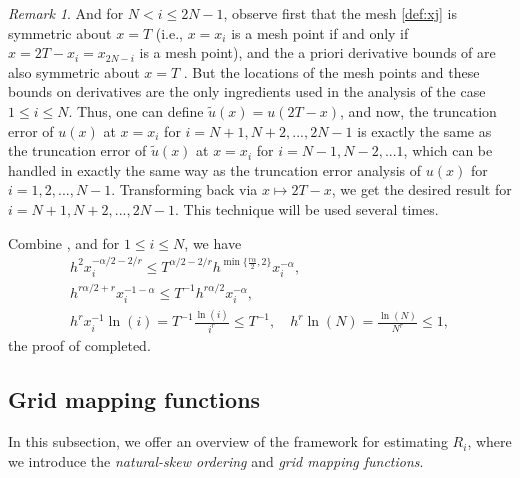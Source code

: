 \documentclass{amsart}
\theoremstyle{definition}
\theoremstyle{remark}
\newtheorem{remark}[theorem]{Remark}
\numberwithin{equation}{section}
\begin{document}
\begin{remark} \label{rmk:symm}
And for \(N<i\le 2N-1\), observe first that the mesh \eqref{def:xj} is symmetric about $x = T$ (i.e., $x = x_i$ is a mesh point if and only if $x = 2T - x_i = x_{2N-i}$ is a mesh point), and the a priori derivative bounds of  are also symmetric about $x = T$ . 
But the locations of the mesh points and these bounds on derivatives
are the only ingredients used in the analysis of the case $1\le i \le N$. Thus, one can define $\tilde{u}(x) = u(2T - x)$, and now, the truncation error of $u(x)$ at $x = x_i$ for $i = N + 1, N + 2, . . . , 2N - 1$ is exactly the same as the truncation error of $\tilde{u}(x)$ at
$x = x_i$ for $i = N -1, N -2, . . . 1$, which can be handled in exactly the same way as the truncation error analysis of $u(x)$ for $i = 1, 2, . . . , N -1$. Transforming back via $x \mapsto 2 T - x$, we get the desired result for $i = N + 1, N + 2, . . . , 2N - 1$.
This technique will be used several times.
\end{remark}

Combine , and for \(1\le i\le N\), we have
\begin{gather*}
  h^2 x_i^{-\alpha/2-2/r} \le T^{\alpha/2-2/r} h^{\min\{\frac{r\alpha}{2}, 2\}} x_i^{-\alpha} ,\\
  h^{r\alpha/2+r} x_i^{-1-\alpha} \le T^{-1} h^{r\alpha/2} x_i^{-\alpha}, \\
  h^r x_i^{-1} \ln(i) = T^{-1} \frac{\ln(i)}{i^r} \le T^{-1}, 
  \quad h^r \ln(N) = \frac{\ln(N)}{N^r} \le 1,
\end{gather*}
the proof of  completed.



\subsection{Grid mapping functions}
\label{subsec:mesh-transport-functions}

In this subsection, we offer an overview of the framework for estimating $R_i$, where we introduce the {\em natural-skew ordering} and {\em grid mapping functions}.
\end{document}
